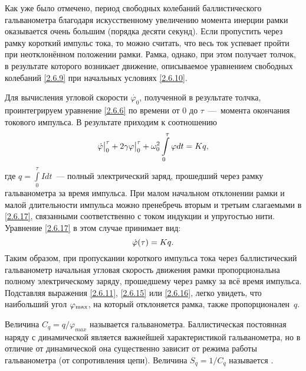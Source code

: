 Как уже было отмечено, период свободных
колебаний баллистического гальванометра благодаря искусственному
увеличению момента инерции рамки оказывается очень большим (порядка
десяти секунд). Если пропустить через рамку короткий импульс тока, то
можно считать, что весь ток успевает пройти при неотклонённом положении
рамки. Рамка, однако, при этом получает толчок, в результате которого
возникает движение, описываемое уравнением свободных колебаний \eqref{2.6.9} при
начальных условиях \eqref{2.6.10}.

Для вычисления угловой скорости $\dot{\varphi_0}$, полученной в результате толчка,
проинтегрируем уравнение \eqref{2.6.6} по времени от $0$ до $\tau$~---~момента 
окончания токового импульса. В результате приходим к соотношению
\begin{equation}
	\eqmark{2.6.17}
	 \dot\varphi\big|^{\tau}_0 + 2\gamma\varphi\big|^{\tau}_0 + 
     \omega_0^2 \int\limits_0^\tau \varphi dt = 
     Kq,
\end{equation}
где $q = \int\limits_0^\tau I dt$~--- полный электрический заряд, прошедший 
через рамку гальванометра за
время импульса. При малом начальном отклонении рамки и малой
длительности импульса можно пренебречь вторым и третьим слагаемыми в
\eqref{2.6.17}, связанными соответственно с током индукции и упругостью нити.
Уравнение \eqref{2.6.17} в этом случае принимает вид:
\begin{equation}
	\eqmark{2.6.18}
	 \dot\varphi(\tau) = Kq.
\end{equation}
Таким образом, при пропускании короткого импульса тока через
баллистический гальванометр начальная угловая скорость движения рамки
пропорциональна полному электрическому заряду, прошедшему через рамку за
всё время импульса. Подставляя выражения 
\eqref{2.6.11}, \eqref{2.6.15} или \eqref{2.6.16}, легко
увидеть, что наибольший угол $\varphi_{\rm max}$, 
на который отклоняется рамка, также пропорционален~$q$.

Величина $C_q = q/\varphi_{max}$ называется  
гальванометра. Баллистическая постоянная наряду с динамической является важнейшей
характеристикой гальванометра, но в отличие от динамической она
существенно зависит от режима работы гальванометра (от сопротивления цепи). 
Величина $S_q = 1/C_q$ называется .

